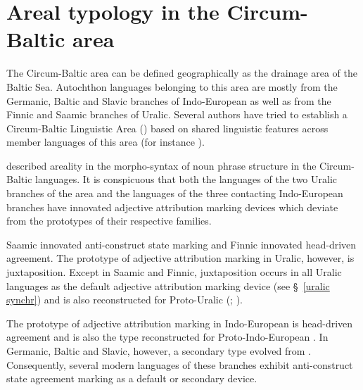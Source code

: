 
\chapter{Areal typology in the Circum-Baltic area}\label{circumbaltic}
The Circum-Baltic area can be defined geographically as the drainage area of the Baltic Sea. Autochthon languages belonging to this area are mostly from the Germanic, Baltic and Slavic branches of Indo-European as well as from the Finnic and Saamic branches of Uralic. Several authors have tried to establish a Circum-Baltic Linguistic Area () based on shared linguistic features across member languages of this area (for instance \citealt{koptjevskaja-tamm2006}).

\cite{riesler2006a} described areality in the morpho-syntax of noun phrase structure in the Circum-Baltic languages. It is conspicuous that both the languages of the two Uralic branches of the area and the languages of the three contacting Indo-European branches have innovated adjective attribution marking devices which deviate from the prototypes of their respective families.

Saamic innovated anti\hyp{}construct state marking and Finnic innovated head\hyp{}driven agreement. The prototype of adjective attribution marking in Uralic, however, is juxtaposition. Except in Saamic and Finnic, juxtaposition occurs in all Uralic languages as the default adjective attribution marking device (see \S~\ref{uralic synchr}) and is also reconstructed for Proto\hyp{}Uralic (\citealt[66, 81]{decsy1990}; \citealt[32]{janhunen1981}).

The prototype of adjective attribution marking in Indo-European is head\hyp{}driven agreement and is also the type reconstructed for Proto\hyp{}Indo-European \citep{decsy1991,watkins1998}. In Germanic, Baltic and Slavic, however, a secondary type evolved from . Consequently, several modern languages of these branches exhibit anti\hyp{}construct state agreement marking as a default or secondary device.

